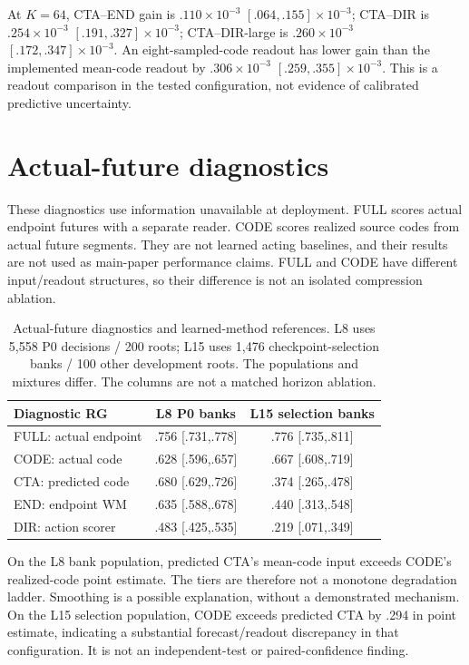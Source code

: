\documentclass[10pt,twocolumn,letterpaper]{article}
\begin{document}
At $K=64$, CTA--END gain is $.110\times10^{-3}$ $[.064,.155]\times10^{-3}$; CTA--DIR is $.254\times10^{-3}$ $[.191,.327]\times10^{-3}$; CTA--DIR-large is $.260\times10^{-3}$ $[.172,.347]\times10^{-3}$. An eight-sampled-code readout has lower gain than the implemented mean-code readout by $.306\times10^{-3}$ $[.259,.355]\times10^{-3}$. This is a readout comparison in the tested configuration, not evidence of calibrated predictive uncertainty.

\section{Actual-future diagnostics}
These diagnostics use information unavailable at deployment. FULL scores actual endpoint futures with a separate reader. CODE scores realized source codes from actual future segments. They are not learned acting baselines, and their results are not used as main-paper performance claims. FULL and CODE have different input/readout structures, so their difference is not an isolated compression ablation.

\begin{table}[t]
\centering\small
\setlength{\tabcolsep}{3pt}
\begin{tabular}{lcc}
\toprule
Diagnostic RG & L8 P0 banks & L15 selection banks \\
\midrule
FULL: actual endpoint & .756 [.731,.778] & .776 [.735,.811] \\
CODE: actual code & .628 [.596,.657] & .667 [.608,.719] \\
CTA: predicted code & .680 [.629,.726] & .374 [.265,.478] \\
END: endpoint WM & .635 [.588,.678] & .440 [.313,.548] \\
DIR: action scorer & .483 [.425,.535] & .219 [.071,.349] \\
\bottomrule
\end{tabular}
\caption{Actual-future diagnostics and learned-method references. L8 uses 5,558 P0 decisions / 200 roots; L15 uses 1,476 checkpoint-selection banks / 100 other development roots. The populations and mixtures differ. The columns are not a matched horizon ablation.}
\end{table}

On the L8 bank population, predicted CTA's mean-code input exceeds CODE's realized-code point estimate. The tiers are therefore not a monotone degradation ladder. Smoothing is a possible explanation, without a demonstrated mechanism. On the L15 selection population, CODE exceeds predicted CTA by .294 in point estimate, indicating a substantial forecast/readout discrepancy in that configuration. It is not an independent-test or paired-confidence finding.
\end{document}
